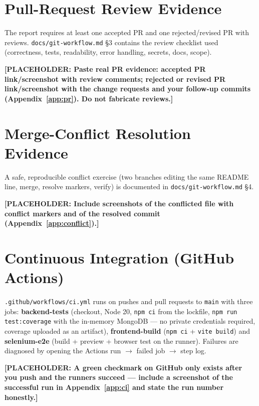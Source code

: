 \documentclass[12pt,a4paper]{article}
\newcommand{\placeholder}[1]{\textbf{[PLACEHOLDER: #1]}}
\begin{document}
\section{Pull-Request Review Evidence}
The report requires at least one accepted PR and one rejected/revised PR
with reviews. \texttt{docs/git-workflow.md} \S 3 contains the review
checklist used (correctness, tests, readability, error handling, secrets,
docs, scope).

\placeholder{Paste real PR evidence: accepted PR link/screenshot with review
comments; rejected or revised PR link/screenshot with the change requests
and your follow-up commits (Appendix~\ref{app:pr}). Do not fabricate reviews.}

\section{Merge-Conflict Resolution Evidence}
A safe, reproducible conflict exercise (two branches editing the same README
line, merge, resolve markers, verify) is documented in
\texttt{docs/git-workflow.md} \S 4.

\placeholder{Include screenshots of the conflicted file with conflict
markers and of the resolved commit (Appendix~\ref{app:conflict}).}

\section{Continuous Integration (GitHub Actions)}
\texttt{.github/workflows/ci.yml} runs on pushes and pull requests to
\texttt{main} with three jobs: \textbf{backend-tests} (checkout, Node 20,
\texttt{npm ci} from the lockfile, \texttt{npm run test:coverage} with the
in-memory MongoDB — no private credentials required, coverage uploaded as an
artifact), \textbf{frontend-build} (\texttt{npm ci} + \texttt{vite build})
and \textbf{selenium-e2e} (build + preview + browser test on the runner).
Failures are diagnosed by opening the Actions run $\rightarrow$ failed job
$\rightarrow$ step log.

\placeholder{A green checkmark on GitHub only exists after you push and the
runners succeed — include a screenshot of the successful run in
Appendix~\ref{app:ci} and state the run number honestly.}
\end{document}
